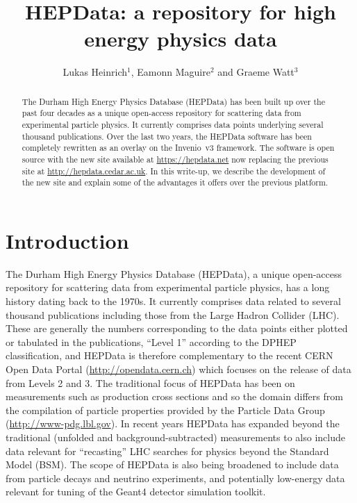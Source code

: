 \documentclass[a4paper]{jpconf}
\begin{document}
\title{HEPData: a repository for high energy physics data}

\author{Lukas Heinrich$^1$, Eamonn Maguire$^2$ and Graeme Watt$^3$}
\address{$^1$ Department of Physics, New York University, New York, USA}
\address{$^2$ CERN, Geneva, Switzerland}
\address{$^3$ IPPP, Department of Physics, Durham University, Durham, UK}


\begin{abstract}
  The Durham High Energy Physics Database (HEPData) has been built up over the past four decades as a unique open-access repository for scattering data from experimental particle physics.  It currently comprises data points underlying several thousand publications.  Over the last two years, the HEPData software has been completely rewritten as an overlay on the Invenio~v3 framework.  The software is open source with the new site available at \url{https://hepdata.net} now replacing the previous site at \url{http://hepdata.cedar.ac.uk}.  In this write-up, we describe the development of the new site and explain some of the advantages it offers over the previous platform.
\end{abstract}

\section{Introduction}

The Durham High Energy Physics Database (HEPData), a unique open-access repository for scattering data from experimental particle physics, has a long history dating back to the 1970s.  It currently comprises data related to several thousand publications including those from the Large Hadron Collider (LHC).  These are generally the numbers corresponding to the data points either plotted or tabulated in the publications, ``Level 1'' according to the DPHEP~\cite{Mount:2009aa} classification, and HEPData is therefore complementary to the recent CERN Open Data Portal (\url{http://opendata.cern.ch}) which focuses on the release of data from Levels 2 and 3.  The traditional focus of HEPData has been on measurements such as production cross sections and so the domain differs from the compilation of particle properties provided by the Particle Data Group (\url{http://www-pdg.lbl.gov}).  In recent years HEPData has expanded beyond the traditional (unfolded and background-subtracted) measurements to also include data relevant for ``recasting'' LHC searches for physics beyond the Standard Model (BSM).  The scope of HEPData is also being broadened to include data from particle decays and neutrino experiments, and potentially low-energy data relevant for tuning of the Geant4 detector simulation toolkit.
\end{document}
